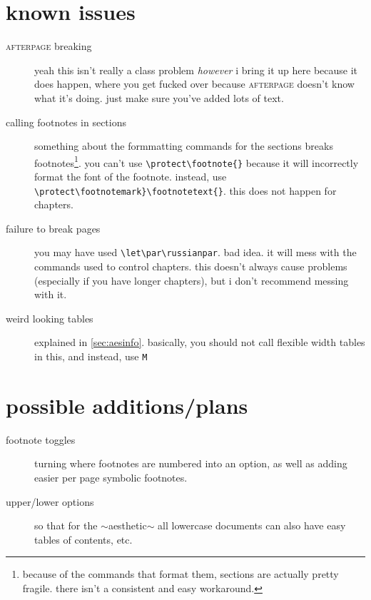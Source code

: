 \documentclass[lowerhead,12pt]{aesthetic}
\begin{document}
\section{known issues}
\begin{description}
    \item[{\scshape\ttfamily afterpage} breaking] yeah this isn't really a class problem \emph{however} i bring it up here because it does happen, where you get fucked over because {\scshape\ttfamily afterpage} doesn't know what it's doing. just make sure you've added lots of text.
    \item[calling footnotes in sections] something about the formmatting commands for the sections breaks footnotes\footnote{because of the commands that format them, sections are actually pretty fragile. there isn't a consistent and easy workaround.}. you can't use \verb|\protect\footnote{}| because it will incorrectly format the font of the footnote. instead, use \verb|\protect\footnotemark}\footnotetext{}|. this does not happen for chapters.
    \item[failure to break pages] you may have used \verb|\let\par\russianpar|. bad idea. it will mess with the commands used to control chapters. this doesn't always cause problems (especially if you have longer chapters), but i don't recommend messing with it.
    \item[weird looking tables] explained in \vref{sec:aesinfo}. basically, you should not call flexible width tables in this, and instead, use \texttt{M}
\end{description}

\section{possible additions/plans}
\begin{description}
    \item[footnote toggles] turning where footnotes are numbered into an option, as well as adding easier per page symbolic footnotes.
    \item[upper/lower options] so that for the $\sim$aesthetic$\sim$ all lowercase documents can also have easy tables of contents, etc.
\end{description}
\end{document}
